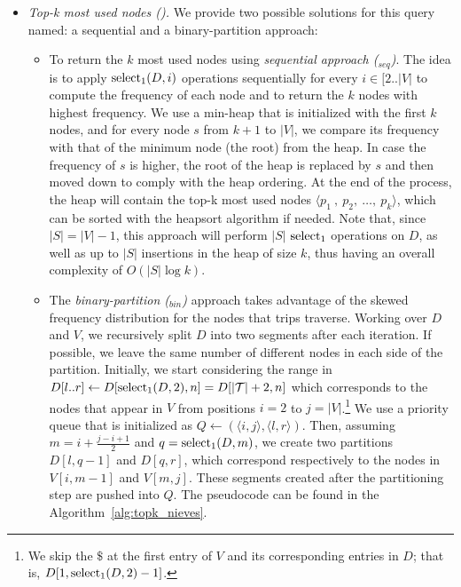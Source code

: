 \begin{itemize}
	\item {\em Top-k most used nodes (\topK).}
	We provide two possible solutions for this query named: a sequential and a binary-partition approach:

	\begin{itemize}
	\item To return the $k$ most used nodes using {\em sequential approach (\topK$_{seq}$)}. The idea is
	to apply  $\operatorname{select}_1(D,i)$ operations sequentially for every $i \in [2..|V|$ to compute the 
	frequency of each node and to return the $k$ nodes with highest frequency.
	We use a min-heap that is initialized with
	the first $k$ nodes, and for every node $s$ from $k+1$ to $|V|$, 
	we compare its frequency with that of the minimum node (the root) from
	the heap. In case the frequency of $s$ is higher, the root of the heap is replaced by $s$ and
	then moved down to comply with the heap ordering. At the end of the process, the heap
	will contain the top-k most used nodes $\langle p_1\:,\:p_2,\:\dots,\:p_k \rangle$, which can be 
	sorted with the heapsort algorithm if needed. 
	Note that, since $|S| = |V|-1$, this approach will perform $|S|$ $\operatorname{select}_1$ operations on $D$, as well as up to $|S|$ insertions in the heap of size $k$, thus having an overall complexity of $O(|S|\log k)$.

	\item The {\em binary-partition (\topK$_{bin}$)} approach takes advantage of the skewed 
	frequency distribution for the nodes that trips traverse.  Working over $D$ and $V$, we 
	recursively split $D$  into two segments after each iteration. 
	If possible, we leave the same number of different nodes in each side of the partition. 
	Initially, we start considering the range in $D[l..r] \leftarrow D[\operatorname{select}_1(D,2),n]=D[|\mathcal{T}|+2,n]$ 
	which corresponds to the nodes that appear in 
	$V$ from positions $i=2$ to $j=|V|$.\footnote{We skip the $\$$ at the first entry of $V$ and its corresponding 
	entries in $D$; that is, $D[1,\operatorname{select}_1(D,2)-1]$.}
	We use a priority queue that is initialized as $Q \leftarrow (\langle i,j\rangle, \langle l,r\rangle)$.
	Then, assuming $m=i + \frac{j-i+1}{2}$ and $q=\operatorname{select}_1(D,m)$, we create two partitions 
	$D[l, q-1]$ and  $D[q, r]$, which correspond respectively to the nodes in $V[i,m-1]$ and $V[m, j]$.
	These  segments created after the partitioning step are
	pushed into  $Q$. %
	The pseudocode can be found in the Algorithm~\ref{alg:topk_nieves}.


\end{itemize}
\end{itemize}
